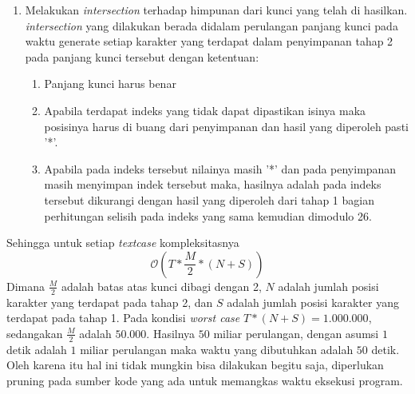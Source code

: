 \begin{enumerate}
	\item Melakukan \textit{intersection} terhadap himpunan dari kunci yang telah di hasilkan\cite{john_jones_spoj_2009}. \textit{intersection} yang dilakukan berada didalam perulangan panjang kunci pada waktu generate setiap karakter yang terdapat dalam penyimpanan tahap 2 pada panjang kunci tersebut dengan ketentuan:
	\begin{enumerate}
	\item Panjang kunci harus benar
	\item Apabila terdapat indeks yang tidak dapat dipastikan isinya maka posisinya harus di buang dari penyimpanan dan hasil yang diperoleh pasti '*'.
	\item Apabila \plaintext pada indeks tersebut nilainya masih '*' dan pada penyimpanan masih menyimpan indek tersebut maka, hasilnya adalah \ciphertext pada indeks tersebut dikurangi dengan hasil yang diperoleh dari tahap 1 bagian perhitungan selisih pada indeks yang sama kemudian dimodulo 26.
	\end{enumerate}
	\end{enumerate}
	Sehingga untuk setiap \textit{textcase} kompleksitasnya 
	$$\mathcal{O}(T*\frac{M}{2}*(N+S))$$ 
	Dimana $\frac{M}{2}$ adalah batas atas kunci dibagi dengan 2, $N$ adalah jumlah posisi karakter yang terdapat pada tahap 2, dan $S$ adalah jumlah posisi karakter yang terdapat pada tahap 1. Pada kondisi \textit{worst case} $T*(N+S)=1.000.000$, sedangakan $\frac{M}{2}$ adalah $50.000$. Hasilnya $50$ miliar perulangan, dengan asumsi $1$ detik adalah $1$ miliar perulangan maka waktu yang dibutuhkan adalah $50$ detik. Oleh karena itu hal ini tidak mungkin bisa dilakukan begitu saja, diperlukan pruning pada sumber kode yang ada untuk memangkas waktu eksekusi program.